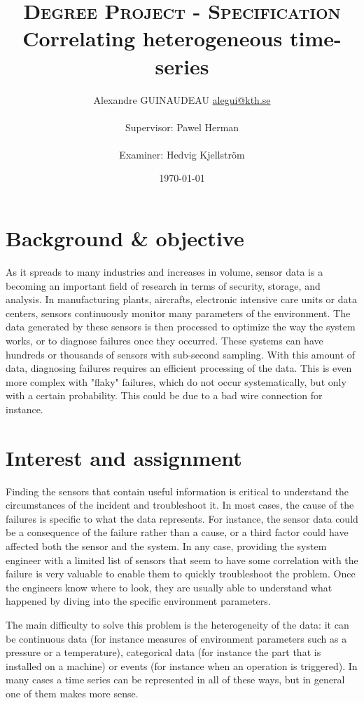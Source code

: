 \documentclass[12pt,a4paper]{article}
\title{\textsc{Degree Project - Specification} \\
\large{\textbf{Correlating heterogeneous time-series}}}
\author{Alexandre GUINAUDEAU \href{mailto:alegui@kth.se}{alegui@kth.se}\\
\\
Supervisor: Pawel Herman\\
\\
Examiner: Hedvig Kjellstr{\"o}m\\
}
\date{\today}
\begin{document}
\maketitle

\newpage

\section*{Background \& objective}

As it spreads to many industries and increases in volume, sensor data is a becoming an important field of research in terms of security, storage, and analysis.
In manufacturing plants, aircrafts, electronic intensive care units or data centers, sensors continuously monitor many parameters of the environment.
The data generated by these sensors is then processed to optimize the way the system works, or to diagnose failures once they occurred.
These systems can have hundreds or thousands of sensors with sub-second sampling.
With this amount of data, diagnosing failures requires an efficient processing of the data.
This is even more complex with "flaky" failures, which do not occur systematically, but only with a certain probability. This could be due to a bad wire connection for instance.


\section*{Interest and assignment}

Finding the sensors that contain useful information is critical to understand the circumstances of the incident and troubleshoot it.
In most cases, the cause of the failures is specific to what the data represents.
For instance, the sensor data could be a consequence of the failure rather than a cause, or a third factor could have affected both the sensor and the system.
In any case, providing the system engineer with a limited list of sensors that seem to have some correlation with the failure is very valuable to enable them to quickly troubleshoot the problem.
Once the engineers know where to look, they are usually able to understand what happened by diving into the specific environment parameters.

The main difficulty to solve this problem is the heterogeneity of the data: it can be continuous data (for instance measures of environment parameters such as a pressure or a temperature), categorical data (for instance the part that is installed on a machine) or events (for instance when an operation is triggered). In many cases a time series can be represented in all of these ways, but in general one of them makes more sense.
\end{document}
